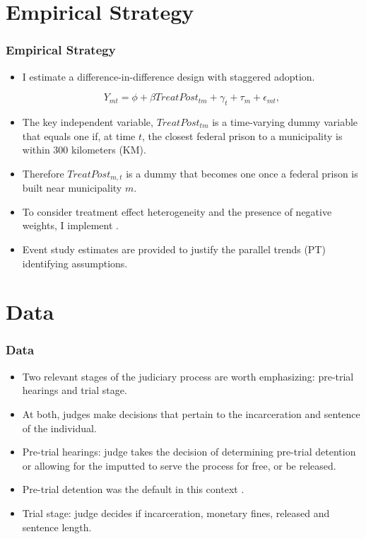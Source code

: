 \documentclass[12pt]{beamer}
\begin{document}
\section{Empirical Strategy}
\begin{frame}
\frametitle{Empirical Strategy}
\small
\begin{itemize}
\item I estimate a difference-in-difference design with staggered adoption.

    \begin{equation}
\label{eq:eq1}
    Y_{mt} = \phi + \beta TreatPost_{tm} + \gamma_t + \tau_m + \epsilon_{mt},
\end{equation}
\small
\item The key independent variable, $TreatPost_{tm}$ is a time-varying dummy variable that equals one if, at time $t$, the closest federal prison to a municipality is within 300 kilometers (KM). 
\item Therefore $TreatPost_{m, t}$ is a dummy that becomes one once a federal prison is built near municipality $m$.
\item To consider treatment effect
 heterogeneity and the presence of negative weights, I
 implement \citep{Callaway}. 
 \item Event study estimates are provided to justify the parallel trends (PT) identifying assumptions.
\end{itemize}
\end{frame}


\section{Data}
\begin{frame}
\frametitle{Data}
\small
\begin{itemize}
    \item Two relevant stages of the judiciary process are worth emphasizing: pre-trial hearings and trial stage.
    \item At both, judges make decisions that pertain to the incarceration and sentence of the individual.
    \item Pre-trial hearings: judge takes the decision of determining pre-trial detention or allowing for the imputted to serve the process for free, or be released.
    \item Pre-trial detention was the default in this context \citep{cossio2015formalprision}.
    \item Trial stage: judge decides if incarceration, monetary fines, released and sentence length.
\end{itemize}
\end{frame}
\end{document}
